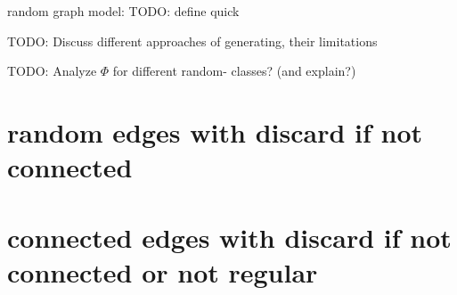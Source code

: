 random graph model:\cite{ghoshal2009random, zhang2010hypergraph}
TODO: define quick

TODO: Discuss different approaches of generating, their limitations

TODO: Analyze $\Phi$ for different random- classes? (and explain?)

\section{random edges with discard if not connected}




\section{connected edges with discard if not connected or not regular}